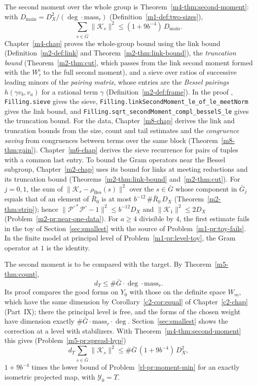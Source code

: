 \documentclass[reqno]{amsart}
\newcounter{chap}
\theoremstyle{definition}
\theoremstyle{plain}
\theoremstyle{remark}
\newcommand{\Yc}{\mathcal Y}
\newcommand{\Kc}{\mathcal K}
\newcommand{\Pc}{\mathcal P}
\newcommand{\Gb}{\bar G}
\newcommand{\Rb}{\bar R_0}
\newcommand{\rB}{\rho_{\mathrm{Bes}}}
\newcommand{\tl}[1]{\texttt{#1}}
\begin{document}
The second moment over the whole group is Theorem~\ref{m4-thm:second-moment}: with \(D_{\mathrm{main}}=D_X^2/(\deg\cdot\mathrm{mass}_r)\) (Definition~\ref{m1-def:two-sizes}),
\[
 \sum_{s\in\Gb}\lVert\Kc_s\rVert^2\le(1+9b^{-4})\,D_{\mathrm{main}} .
\]
Chapter~\ref{m4-chap} proves the whole-group bound using the link bound (Definition~\ref{m2-def:link} and Theorem~\ref{m2-thm:link-bound}), the \emph{truncation bound} (Theorem~\ref{m2-thm:cut}, which passes from the link second moment formed with the \(W_\tau^\flat\) to the full second moment), and a sieve over ratios of successive leading minors of the \emph{pairing matrix}, whose entries are the \emph{Bessel pairings} \(h(\gamma v_b,v_a)\) for a rational term \(\gamma\) (Definition~\ref{m2-def:frame}).  In the proof \cite{GL}, \tl{Filling.sieve} gives the sieve, \tl{Filling.linkSecondMoment\_le\_of\_le\_meetNorm} gives the link bound, and \tl{Filling.sqrt\_secondMoment\_compl\_besselS\_le} gives the truncation bound.  For the data, Chapter~\ref{m8-chap} derives the link and truncation bounds from the size, count and tail estimates and the \emph{congruence saving} from congruences between terms over the same block (Theorem~\ref{m8-thm:gain}).  Chapter~\ref{m6-chap} derives the sieve recurrence for pairs of tuples with a common last entry.  To bound the Gram operators near the Bessel subgroup, Chapter~\ref{m2-chap} uses its bound for links at meeting reductions and its truncation bound (Theorems~\ref{m2-thm:link-bound} and~\ref{m2-thm:cut}).  For \(j=0,1\), the sum of \(\lVert\Kc_s-\rB(s)\rVert^2\) over the \(s\in\Gb\) whose component in \(\Gb_j\) equals that of an element of \(\Rb\) is at most \(b^{-12}\,\#\Rb\,D_X\) (Theorem~\ref{m2-thm:strip}); hence \(\lVert\Pc^{\circ*}\Pc^\circ-1\rVert^2\le b^{-12}D_X\) and \(\lVert\Kc_1\rVert^2\le2D_X\) (Problem~\ref{m2-pr:near-one-data}).  For \(a\ge4\) divisible by \(4\), the first estimate fails in the toy of Section~\ref{sec:smallest} with the source of Problem~\ref{m1-pr:toy-fails}.  In the finite model at principal level of Problem~\ref{m1-pr:level-toy}, the Gram operator at \(1\) is the identity.

The second moment is to be compared with the target.  By Theorem~\ref{m5-thm:count},
\[
 d_T\le\#\Gb\cdot\deg\cdot\mathrm{mass}_r .
\]
Its proof compares the good forms on \(Y_0\) with those on the definite space \(W_m\), which have the same dimension by Corollary~\ref{c2-cor:equal} of Chapter~\ref{c2-chap} (Part~IX); there the principal level is free, and the forms of the chosen weight have dimension exactly \(\#\Gb\cdot\mathrm{mass}_r\cdot\deg\).  Section~\ref{sec:smallest} shows the correction at a level with stabilizers.  With Theorem~\ref{m4-thm:second-moment} this gives (Problem~\ref{m5-pr:spread-hyp})
\[
 d_T\sum_{s\in\Gb}\lVert\Kc_s\rVert^2\le\#\Gb\,(1+9b^{-4})\,D_X^2 ,
\]
\(1+9b^{-4}\) times the lower bound of Problem~\ref{rl-pr:moment-min} for an exactly isometric projected map, with \(\Yc_0=T\).
\end{document}
